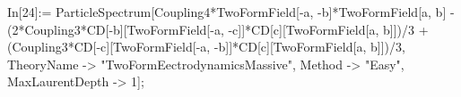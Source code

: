 In[24]:= ParticleSpectrum[Coupling4*TwoFormField[-a, -b]*TwoFormField[a, b] - (2*Coupling3*CD[-b][TwoFormField[-a, -c]]*CD[c][TwoFormField[a, b]])/3 + (Coupling3*CD[-c][TwoFormField[-a, -b]]*CD[c][TwoFormField[a, b]])/3, TheoryName -> "TwoFormEectrodynamicsMassive", Method -> "Easy", MaxLaurentDepth -> 1]; 